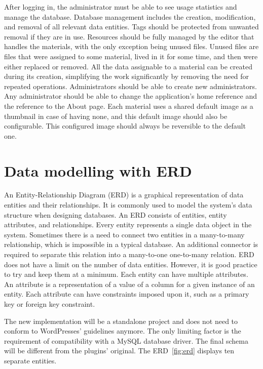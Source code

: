 \documentclass[
  digital,     %
  oneside,     %
  nosansbold,  %
  colorbold, %
  lof,         %
  lot,         %
]{fithesis4}
\begin{document}
After logging in, the administrator must be able to see usage statistics and manage the database. Database management includes the creation, modification, and removal of all relevant data entities. Tags should be protected from unwanted removal if they are in use. Resources should be fully managed by the editor that handles the materials, with the only exception being unused files. Unused files are files that were assigned to some material, lived in it for some time, and then were either replaced or removed. All the data assignable to a material can be created during its creation, simplifying the work significantly by removing the need for repeated operations. Administrators should be able to create new administrators. Any administrator should be able to change the application's home reference and the reference to the About page. Each material uses a shared default image as a thumbnail in case of having none, and this default image should also be configurable. This configured image should always be reversible to the default one.

\section{Data modelling with ERD}

An Entity-Relationship Diagram (ERD) is a graphical representation of data entities and their relationships. It is commonly used to model the system's data structure when designing databases. An ERD consists of entities, entity attributes, and relationships. Every entity represents a single data object in the system. Sometimes there is a need to connect two entities in a many-to-many relationship, which is impossible in a typical database. An additional connector is required to separate this relation into a many-to-one one-to-many relation. ERD does not have a limit on the number of data entities. However, it is good practice to try and keep them at a minimum. Each entity can have multiple attributes. An attribute is a representation of a value of a column for a given instance of an entity. Each attribute can have constraints imposed upon it, such as a primary key or foreign key constraint.

The new implementation will be a standalone project and does not need to conform to WordPresses' guidelines anymore. The only limiting factor is the requirement of compatibility with a MySQL database driver. The final schema will be different from the plugins' original. The ERD~\ref{fig:erd} displays ten separate entities.
\end{document}
